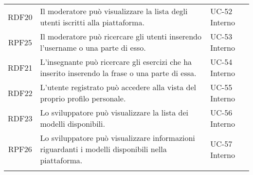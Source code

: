 \begin{tabularx}{\textwidth}{| c | p{10cm} | X |}
		RDF20 & Il moderatore può visualizzare la lista degli utenti iscritti alla piattaforma. & UC-52 \newline Interno\\
		RPF25 & Il moderatore può ricercare gli utenti inserendo l'username o una parte di esso. & UC-53 \newline Interno\\
		RDF21 & L'insegnante può ricercare gli esercizi che ha inserito inserendo la frase o una parte di essa. & UC-54 \newline Interno\\
		RDF22 & L'utente registrato può accedere alla vista del proprio profilo personale. & UC-55 \newline Interno\\
		RDF23 & Lo sviluppatore può visualizzare la lista dei modelli disponibili. & UC-56 \newline Interno\\
		RPF26 & Lo sviluppatore può visualizzare informazioni riguardanti i modelli disponibili nella piattaforma. & UC-57 \newline Interno\\
		\hline
		\caption{Tabella dei requisiti funzionali}
\end{tabularx}

